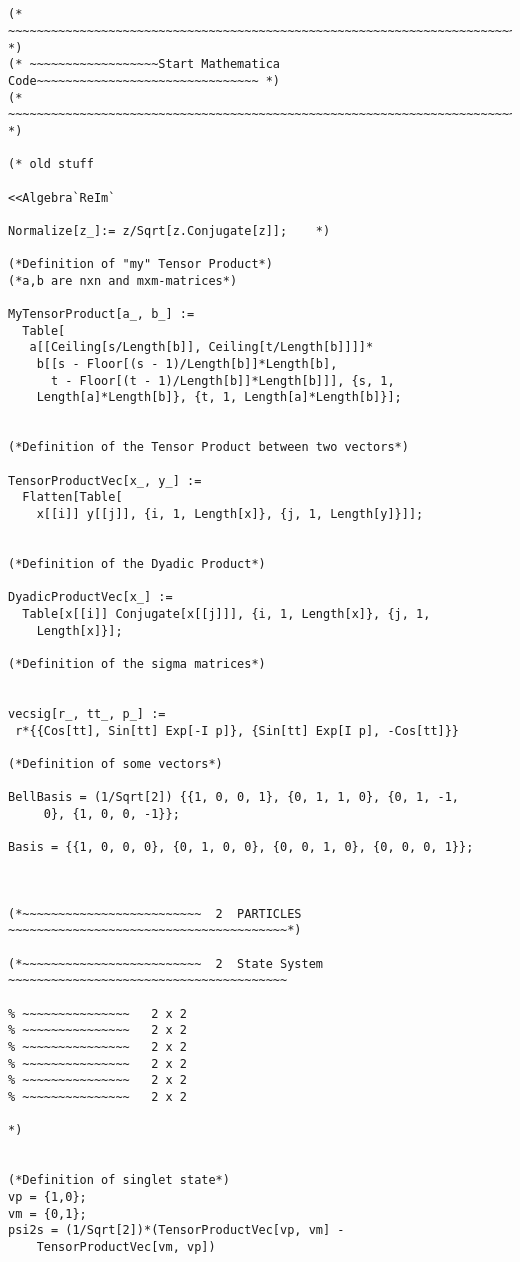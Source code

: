 \documentclass[%
 showpacs,
 showkeys,
 preprintnumbers,
 amsmath,amssymb,
 aps,
  pra,
  longbibliography,
 floatfix,
 ]{revtex4-1}
\begin{document}
{ \begin{lstlisting}[backgroundcolor=\color{yellow!10},framerule=0pt,breaklines=true, frame=tb]


(* ~~~~~~~~~~~~~~~~~~~~~~~~~~~~~~~~~~~~~~~~~~~~~~~~~~~~~~~~~~~~~~~~~~~~~~~ *)
(* ~~~~~~~~~~~~~~~~~~Start Mathematica Code~~~~~~~~~~~~~~~~~~~~~~~~~~~~~~~ *)
(* ~~~~~~~~~~~~~~~~~~~~~~~~~~~~~~~~~~~~~~~~~~~~~~~~~~~~~~~~~~~~~~~~~~~~~~~ *)

(* old stuff

<<Algebra`ReIm`

Normalize[z_]:= z/Sqrt[z.Conjugate[z]];    *)

(*Definition of "my" Tensor Product*)
(*a,b are nxn and mxm-matrices*)

MyTensorProduct[a_, b_] :=
  Table[
   a[[Ceiling[s/Length[b]], Ceiling[t/Length[b]]]]*
    b[[s - Floor[(s - 1)/Length[b]]*Length[b],
      t - Floor[(t - 1)/Length[b]]*Length[b]]], {s, 1,
    Length[a]*Length[b]}, {t, 1, Length[a]*Length[b]}];


(*Definition of the Tensor Product between two vectors*)

TensorProductVec[x_, y_] :=
  Flatten[Table[
    x[[i]] y[[j]], {i, 1, Length[x]}, {j, 1, Length[y]}]];


(*Definition of the Dyadic Product*)

DyadicProductVec[x_] :=
  Table[x[[i]] Conjugate[x[[j]]], {i, 1, Length[x]}, {j, 1,
    Length[x]}];

(*Definition of the sigma matrices*)


vecsig[r_, tt_, p_] :=
 r*{{Cos[tt], Sin[tt] Exp[-I p]}, {Sin[tt] Exp[I p], -Cos[tt]}}

(*Definition of some vectors*)

BellBasis = (1/Sqrt[2]) {{1, 0, 0, 1}, {0, 1, 1, 0}, {0, 1, -1,
     0}, {1, 0, 0, -1}};

Basis = {{1, 0, 0, 0}, {0, 1, 0, 0}, {0, 0, 1, 0}, {0, 0, 0, 1}};



(*~~~~~~~~~~~~~~~~~~~~~~~~~  2  PARTICLES ~~~~~~~~~~~~~~~~~~~~~~~~~~~~~~~~~~~~~~~*)

(*~~~~~~~~~~~~~~~~~~~~~~~~~  2  State System ~~~~~~~~~~~~~~~~~~~~~~~~~~~~~~~~~~~~~~~

% ~~~~~~~~~~~~~~~   2 x 2
% ~~~~~~~~~~~~~~~   2 x 2
% ~~~~~~~~~~~~~~~   2 x 2
% ~~~~~~~~~~~~~~~   2 x 2
% ~~~~~~~~~~~~~~~   2 x 2
% ~~~~~~~~~~~~~~~   2 x 2

*)


(*Definition of singlet state*)
vp = {1,0};
vm = {0,1};
psi2s = (1/Sqrt[2])*(TensorProductVec[vp, vm] -
    TensorProductVec[vm, vp])


\end{lstlisting}}
\end{document}
